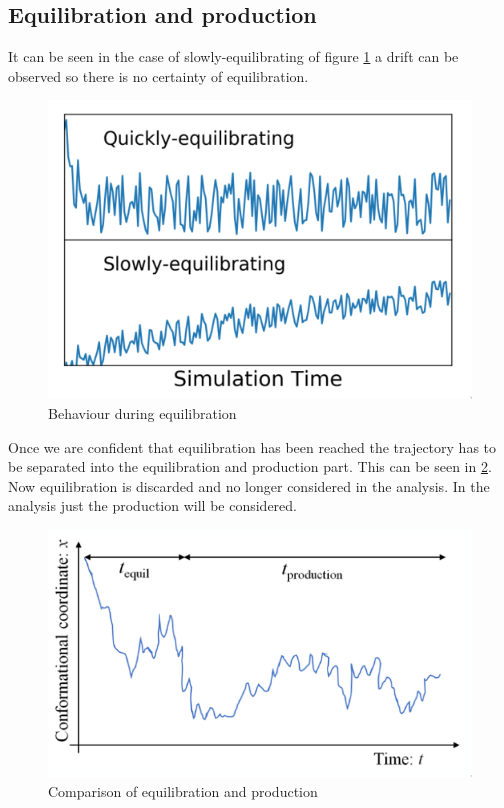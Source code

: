 	\subsection{Equilibration and production}
	It can be seen in the case of slowly-equilibrating of figure \ref{fig:equilibration} a drift can be observed so there is no certainty of equilibration.

	\begin{figure}[H]
		\centering
		\includegraphics[scale = 0.5]{equilibration}
		\caption{Behaviour during equilibration}
		\label{fig:equilibration}
	\end{figure}

	Once we are confident that equilibration has been reached the trajectory has to be separated into the equilibration and production part.
	This can be seen in \ref{fig:equilibration-production}.
	Now equilibration is discarded and no longer considered in the analysis.
	In the analysis just the production will be considered.

	\begin{figure}[H]
		\centering
		\includegraphics[scale = 0.5]{equilibration-production}
		\caption{Comparison of equilibration and production}
		\label{fig:equilibration-production}
	\end{figure}

